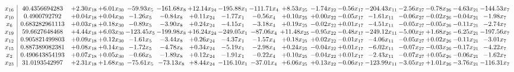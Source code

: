 \documentclass[9pt]{article}
\begin{document}
 \[\begin{array}{c| c c@{\hskip 2pt} c@{\hskip 2pt} c@{\hskip 2pt} c@{\hskip 2pt} c@{\hskip 2pt} c@{\hskip 2pt} c@{\hskip 2pt} c@{\hskip 2pt} c@{\hskip 2pt} c@{\hskip 2pt} c@{\hskip 2pt} c@{\hskip 2pt} c@{\hskip 2pt} c@{\hskip 2pt} c@{\hskip 2pt} }
 x_{16}   &  40.4356694283 & +  2.30 x_{18} & +  6.01 x_{30} & -59.93 x_{5} & -161.68 x_{8} & + 12.14 x_{24} & -195.88 x_{1} & -111.71 x_{4} & +  8.53 x_{25} & -1.74 x_{22} & -0.56 x_{17} & -204.43 x_{11} & -2.56 x_{27} & -0.78 x_{26} & -4.63 x_{21} & -144.53 x_{7}\\
 x_{10}   &  0.4900792792 & +  0.04 x_{18} & +  0.04 x_{30} & -1.26 x_{5} & -0.84 x_{8} & +  0.11 x_{24} & -1.77 x_{1} & -0.56 x_{4} & +  0.10 x_{25} & +  0.00 x_{22} & -0.05 x_{17} & -1.61 x_{11} & -0.06 x_{27} & -0.02 x_{26} & -0.04 x_{21} & -1.98 x_{7}\\
 x_{6}   &  0.683282961113 & +  0.03 x_{18} & +  0.18 x_{30} & -0.89 x_{5} & -3.90 x_{8} & +  0.24 x_{24} & -4.15 x_{1} & -3.18 x_{4} & +  0.19 x_{25} & -0.02 x_{22} & +  0.01 x_{17} & -4.51 x_{11} & -0.05 x_{27} & -0.05 x_{26} & -0.11 x_{21} & -2.74 x_{7}\\
 x_{19}   &  59.6627648468 & +  4.44 x_{18} & +  6.03 x_{30} & -123.45 x_{5} & -199.98 x_{8} & + 16.24 x_{24} & -249.05 x_{1} & -87.06 x_{4} & + 11.48 x_{25} & -0.95 x_{22} & -0.48 x_{17} & -249.12 x_{11} & -5.00 x_{27} & +  1.68 x_{26} & -6.25 x_{21} & -197.56 x_{7}\\
 x_{12}   &  0.905821499803 & +  0.09 x_{18} & +  0.12 x_{30} & -1.61 x_{5} & -3.44 x_{8} & +  0.26 x_{24} & -4.37 x_{1} & -1.57 x_{4} & +  0.18 x_{25} & +  0.02 x_{22} & -0.01 x_{17} & -4.06 x_{11} & -0.05 x_{27} & +  0.02 x_{26} & -0.11 x_{21} & -3.01 x_{7}\\
 x_{15}   &  0.887389082381 & +  0.08 x_{18} & +  0.14 x_{30} & -1.72 x_{5} & -4.78 x_{8} & +  0.34 x_{24} & -5.19 x_{1} & -2.98 x_{4} & +  0.24 x_{25} & -0.04 x_{22} & +  0.01 x_{17} & -6.02 x_{11} & -0.07 x_{27} & -0.03 x_{26} & -0.17 x_{21} & -4.22 x_{7}\\
 x_{2}   &  0.490643854193 & +  0.07 x_{18} & +  0.05 x_{30} & -0.66 x_{5} & -1.89 x_{8} & +  0.12 x_{24} & -1.91 x_{1} & -0.22 x_{4} & +  0.10 x_{25} & -0.04 x_{22} & +  0.01 x_{17} & -2.43 x_{11} & -0.07 x_{27} & +  0.05 x_{26} & -0.06 x_{21} & -1.62 x_{7}\\
 x_{23}   &  31.0193542997 & +  2.31 x_{18} & +  1.68 x_{30} & -75.61 x_{5} & -73.13 x_{8} & +  8.44 x_{24} & -116.10 x_{1} & -37.01 x_{4} & +  6.06 x_{25} & +  0.13 x_{22} & -0.06 x_{17} & -123.99 x_{11} & -3.05 x_{27} & +  1.01 x_{26} & -3.76 x_{21} & -116.31 x_{7}\\

\end{array}\]
\end{document}
